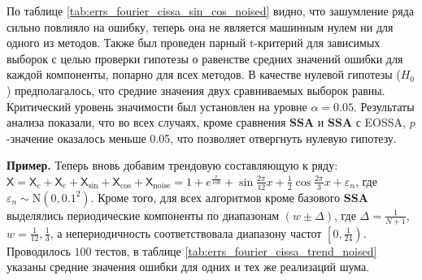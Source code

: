 \documentclass[a4paper, 11pt]{article}
\newcommand{\SSA}{\textbf{SSA}}
\newcommand{\TS}{\mathsf{X}}
\begin{document}

По таблице \ref{tab:errs_fourier_cissa_sin_cos_noised} видно, что зашумление ряда сильно повлияло на ошибку, теперь она не является машинным нулем ни для одного из методов. Также был проведен парный t-критерий для зависимых выборок с целью проверки гипотезы о равенстве средних значений ошибки для каждой компоненты, попарно для всех методов. В качестве нулевой гипотезы ($H_0$) предполагалось, что средние значения двух сравниваемых выборок равны. Критический уровень значимости был установлен на уровне $\alpha = 0.05$.
Результаты анализа показали, что во всех случаях, кроме сравнения $\SSA$ и $\SSA$ с EOSSA, $p$-значение оказалось меньше 0.05, что позволяет отвергнуть нулевую гипотезу.

\textbf{\large{Пример.}} Теперь вновь добавим трендовую составляющую к ряду: $\TS = \TS_{c} + \TS_e + \TS_{\sin} + \TS_{\cos} + \TS_{\mathrm{noise}} = 1 + e^{\frac{x}{100}} + \sin{\frac{2\pi}{12}x} + \frac{1}{2}\cos{\frac{2\pi}{3}x} + \varepsilon_n$, где $\varepsilon_n \sim \mathrm N(0, 0.1^2)$. Кроме того, для всех алгоритмов кроме базового $\SSA$ выделялись периодические компоненты по диапазонам $\left(w \pm \Delta \right)$, где $\Delta = \frac{1}{N+1}$, $w = \frac{1}{12}, \frac{1}{3}$, а непериодичность соответствовала диапазону частот $\left[0, \frac{1}{24} \right)$. Проводилось $100$ тестов, в таблице \ref{tab:errs_fourier_cissa_trend_noised} указаны средние значения ошибки для одних и тех же реализаций шума.
\end{document}
